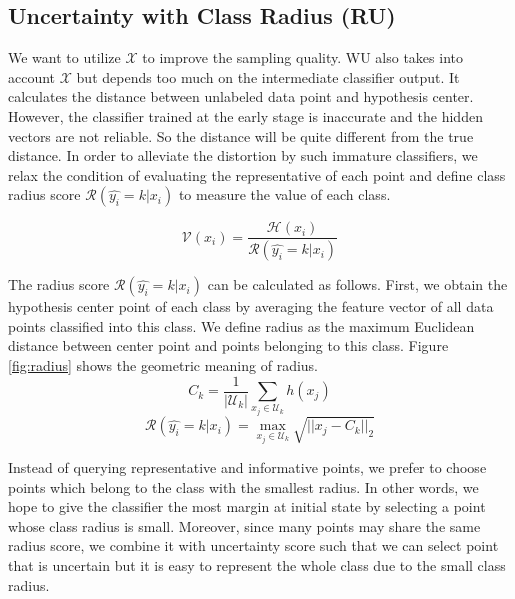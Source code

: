 \subsection{Uncertainty with Class Radius (RU)}
\label{sec:classradius}
We want to utilize $\mathcal{X}$ to improve the sampling quality. 
WU also takes into account $\mathcal{X}$ but depends too much on the 
intermediate classifier output. It calculates the distance
between unlabeled data point and hypothesis center. 
However, the classifier trained at the early stage
is inaccurate and the hidden vectors are not reliable. 
So the distance will be quite different from the true distance. 
In order to alleviate the distortion by such immature classifiers, we relax the condition of evaluating the representative of each point and define class radius score $\mathcal{R}(\hat{y_i}=k|x_i)$ to measure the value of each class. 
    
\begin{equation}
\mathcal{V}(x_i) = \frac{\mathcal{H}(x_i)} {\mathcal{R}(\hat{y_i}=k|x_i)}
\end{equation}
    
The radius score $\mathcal{R}(\hat{y_i}=k|x_i)$ can be calculated as follows. First, we obtain the hypothesis center point of each class by averaging the feature vector of all data points classified into this class. We define radius as the maximum Euclidean distance between center point and points belonging to this class. Figure \ref{fig:radius} shows the geometric meaning of radius.
    \begin{equation}
        C_k = \frac{1}{|\mathcal{U}_k|} \sum_{x_j \in \mathcal{U}_k} h(x_j)
    \end{equation}
    \begin{equation}
        \mathcal{R}(\hat{y_i}=k|x_i) = \max_{x_j \in \mathcal{U}_k} \sqrt{||x_j - C_k||_2} 
    \end{equation}
    
Instead of querying representative and informative points, we prefer to choose points which belong to the class with the smallest radius. 
In other words, we hope to give the classifier the most margin at initial state by selecting a point whose class radius is small. Moreover, since many points may share the same radius score, we combine it with uncertainty score such that we can select point that is uncertain but it is easy to represent the whole class due to the small class radius.
    

